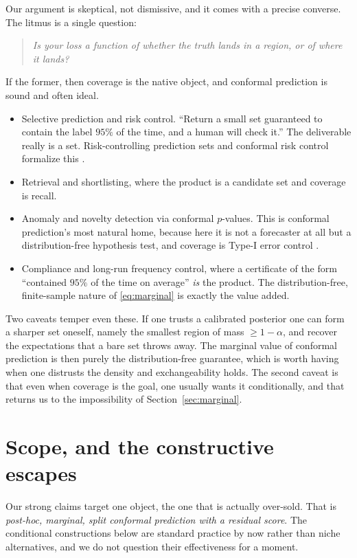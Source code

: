 \documentclass[11pt]{article}
\theoremstyle{definition}
\begin{document}
Our argument is skeptical, not dismissive, and it comes with a precise converse. The litmus
is a single question:
\begin{quote}
\emph{Is your loss a function of \emph{whether} the truth lands in a region, or of
\emph{where} it lands?}
\end{quote}
If the former, then coverage is the native object, and conformal prediction is sound and
often ideal.
\begin{itemize}
  \item Selective prediction and risk control. ``Return a small set guaranteed to contain
  the label $95\%$ of the time, and a human will check it.'' The deliverable really is a
  set. Risk-controlling prediction sets and conformal risk control formalize this
  \citep{angelopoulos2021uncertainty, bates2021distribution, angelopoulos2024conformalrisk}.
  \item Retrieval and shortlisting, where the product is a candidate set and coverage is
  recall.
  \item Anomaly and novelty detection via conformal $p$-values. This is conformal
  prediction's most natural home, because here it is not a forecaster at all but a
  distribution-free hypothesis test, and coverage is Type-I error control
  \citep{vovk2005algorithmic}.
  \item Compliance and long-run frequency control, where a certificate of the form
  ``contained $95\%$ of the time on average'' \emph{is} the product. The distribution-free,
  finite-sample nature of \eqref{eq:marginal} is exactly the value added.
\end{itemize}
Two caveats temper even these. If one trusts a calibrated posterior one can form a sharper
set oneself, namely the smallest region of mass $\ge 1-\alpha$, and recover the expectations
that a bare set throws away. The marginal value of conformal prediction is then purely the
distribution-free guarantee, which is worth having when one distrusts the density and
exchangeability holds. The second caveat is that even when coverage is the goal, one usually
wants it conditionally, and that returns us to the impossibility of
Section~\ref{sec:marginal}.

\section{Scope, and the constructive escapes}\label{sec:scope}

Our strong claims target one object, the one that is actually over-sold. That is
\emph{post-hoc, marginal, split conformal prediction with a residual score}. The conditional
constructions below are standard practice by now rather than niche alternatives, and we do
not question their effectiveness for a moment.
\end{document}
